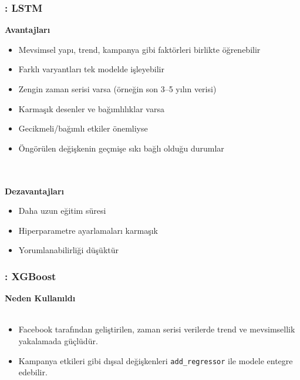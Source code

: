 \documentclass[12pt]{beamer}
\begin{document}
\begin{frame}
	\frametitle{\insertsection: LSTM}
	\textbf{Avantajları}
	\begin{itemize}
		\item Mevsimsel yapı, trend, kampanya gibi faktörleri birlikte
		      öğrenebilir
		\item Farklı varyantları tek modelde işleyebilir
		\item Zengin zaman serisi varsa (örneğin son 3–5 yılın verisi)
		\item Karmaşık desenler ve bağımlılıklar varsa
		\item Gecikmeli/bağımlı etkiler önemliyse
		\item Öngörülen değişkenin geçmişe sıkı bağlı olduğu durumlar
	\end{itemize} \\~\\

	\textbf{Dezavantajları}
	\begin{itemize}
		\item Daha uzun eğitim süresi
		\item Hiperparametre ayarlamaları karmaşık
		\item Yorumlanabilirliği düşüktür
	\end{itemize}
\end{frame}

\begin{frame}
	\frametitle{\insertsection: XGBoost}
	\textbf{Neden Kullanıldı} \\~\\
	\begin{itemize}
		\item Facebook tarafından geliştirilen, zaman serisi verilerde
		      trend ve mevsimsellik yakalamada güçlüdür.
		\item Kampanya etkileri gibi dışsal değişkenleri
		      \texttt{add\_regressor} ile modele entegre edebilir.
	\end{itemize}
\end{frame}
\end{document}
